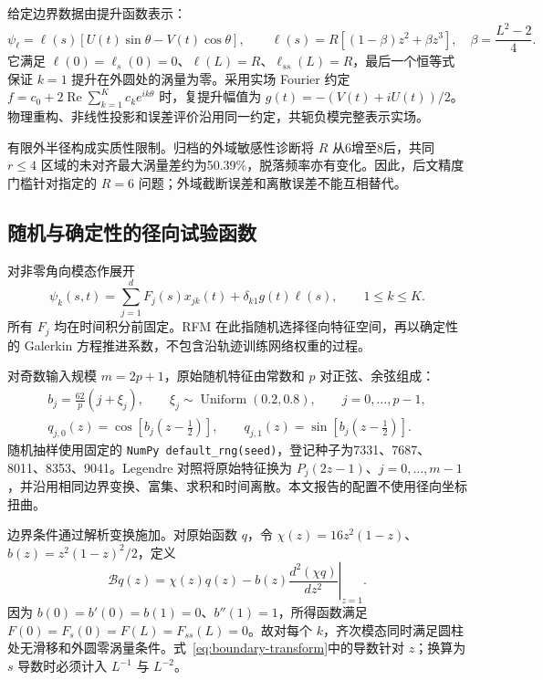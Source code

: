 给定边界数据由提升函数表示：
\begin{equation}
 \psi_\ell=\ell(s)[U(t)\sin\theta-V(t)\cos\theta],\qquad
 \ell(s)=R[(1-\beta)z^2+\beta z^3],\quad
 \beta=\frac{L^2-2}{4}.
 \label{eq:lifting}
\end{equation}
它满足 \(\ell(0)=\ell_s(0)=0\)、\(\ell(L)=R\)、\(\ell_{ss}(L)=R\)，最后一个恒等式保证 \(k=1\) 提升在外圆处的涡量为零。采用实场 Fourier 约定 \(f=c_0+2\operatorname{Re}\sum_{k=1}^{K}c_ke^{ik\theta}\) 时，复提升幅值为 \(g(t)=-(V(t)+iU(t))/2\)。物理重构、非线性投影和误差评价沿用同一约定，共轭负模完整表示实场。

有限外半径构成实质性限制。归档的外域敏感性诊断将 \(R\) 从6增至8后，共同 \(r\le4\) 区域的未对齐最大涡量差约为50.39\%，脱落频率亦有变化。因此，后文精度门槛针对指定的 \(R=6\) 问题；外域截断误差和离散误差不能互相替代。

\subsection{随机与确定性的径向试验函数}

对非零角向模态作展开
\begin{equation}
 \psi_k(s,t)=\sum_{j=1}^{d}F_j(s)x_{jk}(t)
                  +\delta_{k1}g(t)\ell(s),\qquad 1\le k\le K.
 \label{eq:trial-expansion}
\end{equation}
所有 \(F_j\) 均在时间积分前固定。RFM 在此指随机选择径向特征空间，再以确定性的 Galerkin 方程推进系数，不包含沿轨迹训练网络权重的过程\cite{r1,r2,r3}。

对奇数输入规模 \(m=2p+1\)，原始随机特征由常数和 \(p\) 对正弦、余弦组成：
\begin{equation}
 \begin{gathered}
 b_j=\frac{62}{p}(j+\xi_j),\qquad
 \xi_j\sim\operatorname{Uniform}(0.2,0.8),\qquad j=0,\ldots,p-1,\\
 q_{j,0}(z)=\cos[b_j(z-\tfrac12)],\qquad
 q_{j,1}(z)=\sin[b_j(z-\tfrac12)].
 \end{gathered}
 \label{eq:random-features}
\end{equation}
随机抽样使用固定的 \texttt{NumPy default\_rng(seed)}，登记种子为7331、7687、8011、8353、9041。Legendre 对照将原始特征换为 \(P_j(2z-1)\)、\(j=0,\ldots,m-1\)，并沿用相同边界变换、富集、求积和时间离散。本文报告的配置不使用径向坐标扭曲。

边界条件通过解析变换施加。对原始函数 \(q\)，令 \(\chi(z)=16z^2(1-z)\)、\(b(z)=z^2(1-z)^2/2\)，定义
\begin{equation}
 \mathcal Bq(z)=\chi(z)q(z)
       -b(z)\left.\frac{d^2(\chi q)}{dz^2}\right|_{z=1}.
 \label{eq:boundary-transform}
\end{equation}
因为 \(b(0)=b'(0)=b(1)=0\)、\(b''(1)=1\)，所得函数满足 \(F(0)=F_s(0)=F(L)=F_{ss}(L)=0\)。故对每个 \(k\)，齐次模态同时满足圆柱处无滑移和外圆零涡量条件。式~\eqref{eq:boundary-transform}中的导数针对 \(z\)；换算为 \(s\) 导数时必须计入 \(L^{-1}\) 与 \(L^{-2}\)。

